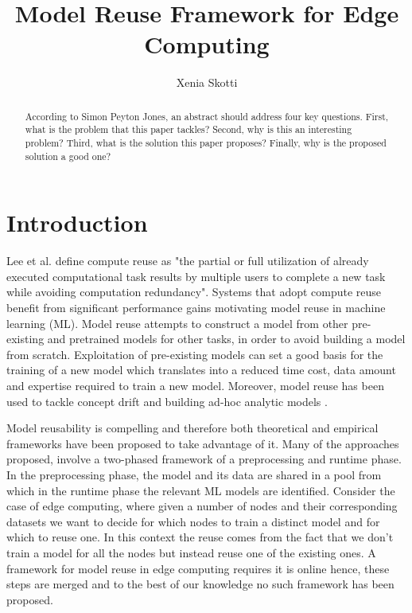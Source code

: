 \documentclass{mpaper}
\begin{document}
\title{Model Reuse Framework for Edge Computing}
\author{Xenia Skotti}

\maketitle

\begin{abstract}

According to Simon Peyton Jones, an abstract should address
four key questions. First, what is the problem that this
paper tackles? Second, why is this an interesting problem?
Third, what is the solution this paper proposes?
Finally, why is the proposed solution a good one?
\end{abstract}


\section{Introduction}

Lee et al. \cite{ComputeReuse} define compute reuse as "the partial or full utilization of already executed computational task results by multiple users to complete a new task while avoiding computation redundancy".  Systems that adopt compute reuse benefit from significant performance gains motivating model reuse in machine learning (ML). Model reuse \cite{Learnware} attempts to construct a model from other pre-existing and pretrained models for other tasks, in order to avoid building a model from scratch. Exploitation of pre-existing models can set a good basis for the training of a new model which translates into a reduced time cost, data amount and expertise required to train a new model. Moreover, model reuse has been used to tackle concept drift \cite{ConceptDrift} and building ad-hoc analytic models \cite{MaterializationReuse}.

Model reusability is compelling and therefore both theoretical \cite{Learnware} and empirical \cite{MaterializationReuse}\cite{KernelMMD}  frameworks have been proposed to take advantage of it. Many of the approaches proposed, involve a two-phased framework of a preprocessing and runtime phase. In the preprocessing phase, the model and its data are shared in a pool from which in the runtime phase the relevant ML models are identified. Consider the case of edge computing, where given a number of nodes and their corresponding datasets we want to decide for which nodes to train a distinct model and for which to reuse one. In this context the reuse comes from the fact that we don’t train a model for all the nodes but instead reuse one of the existing ones. A framework for model reuse in edge computing requires it is online hence, these steps are merged and to the best of our knowledge no such framework has been proposed. 
\end{document}
